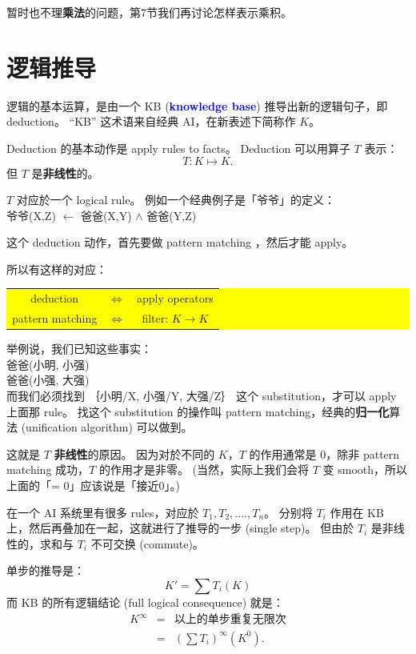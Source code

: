 \documentclass[12pt]{article}
\newcommand{\concept}[1]{\textbf{\textcolor{blue}{#1}}}
\newcommand{\formula}[1]{\textcolor{LogicColor}{#1}}
\newcommand{\tab}{\hspace*{1cm}}
\begin{document}
暂时也不理\textbf{乘法}的问题，第7节我们再讨论怎样表示乘积。

\section{逻辑推导}

逻辑的基本运算，是由一个 KB (\concept{knowledge base}) 推导出新的逻辑句子，即  deduction。 ``KB'' 这术语来自经典 AI，在新表述下简称作 $K$。

Deduction 的基本动作是 apply rules to facts。 Deduction 可以用算子 $T$ 表示：
$$ T: K \mapsto K .$$
但 $T$ 是\textbf{非线性}的。

$T$ 对应於一个 logical rule。  例如一个经典例子是「爷爷」的定义：\\
\tab \formula{ 爷爷(X,Z) $\leftarrow$ 爸爸(X,Y) $\wedge$ 爸爸(Y,Z)}

这个 deduction 动作，首先要做 pattern matching ，然后才能 apply。

所以有这样的对应：
\begin{center}
\colorbox{yellow}{\parbox{0.55\textwidth}{
\begin{tabular}{ccc}
deduction & $\Leftrightarrow$ & apply operators \\
pattern matching & $\Leftrightarrow$ & filter: $K \rightarrow K$ \\ 
\end{tabular}
}}
\end{center}

举例说，我们已知这些事实：\\
\tab \formula{爸爸(小明, 小强)} \\
\tab \formula{爸爸(小强, 大强)} \\
而我们必须找到 ｛小明/X, 小强/Y, 大强/Z｝ 这个 substitution，才可以 apply 上面那 rule。  找这个 substitution 的操作叫 pattern matching，经典的\textbf{归一化}算法 (unification algorithm) 可以做到。

这就是 $T$ \textbf{非线性}的原因。  因为对於不同的 $K$，$T$ 的作用通常是 0，除非 pattern matching 成功，$T$ 的作用才是非零。 (当然，实际上我们会将 $T$ 变 smooth，所以上面的「= 0」应该说是「接近0」。)

在一个 AI 系统里有很多 rules，对应於 $T_1, T_2, ...., T_n$。  分别将 $T_i$ 作用在 KB 上，然后再叠加在一起，这就进行了推导的一步 (single step)。  但由於 $T_i$ 是非线性的，求和与 $T_i$ 不可交换 (commute)。

单步的推导是：
     $$ K' = \sum T_i (K) $$
而 KB 的所有逻辑结论 (full logical consequence) 就是：
\begin{eqnarray} \nonumber
K^\infty & = & \mbox{以上的单步重复无限次} \\ \nonumber
         & = &  (\sum T_i) ^\infty (K^0) .
\end{eqnarray}
\end{document}
